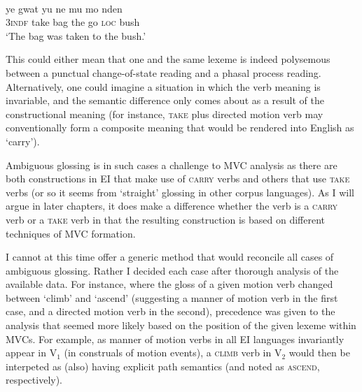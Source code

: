 \ea \label{}
\\
\gll ye gwat yu ne mu mo nden \\
3\textsc{indf} take bag the go \textsc{loc} bush \\
\glft `The bag was taken to the bush.' \\ 
\z

This could either mean that one and the same lexeme is indeed polysemous between a punctual change-of-state reading and a phasal process reading. Alternatively, one could imagine a situation in which the verb meaning is invariable, and the semantic difference only comes about as a result of the constructional meaning (for instance, \textsc{take} plus directed motion verb may conventionally form a composite meaning that would be rendered into English as `carry'). 

Ambiguous glossing is in such cases a challenge to MVC analysis as there are both constructions in EI that make use of \textsc{carry} verbs and others that use \textsc{take} verbs (or so it seems from `straight' glossing in other corpus languages). As I will argue in later chapters, it does make a difference whether the verb is a \textsc{carry} verb or a \textsc{take} verb in that the resulting construction is based on different techniques of MVC formation. 

I cannot at this time offer a generic method that would reconcile all cases of ambiguous glossing. Rather I decided each case after thorough analysis of the available data. For instance, where the gloss of a given motion verb changed between `climb' and `ascend' (suggesting a manner of motion verb in the first case, and a directed motion verb in the second), precedence was given to the analysis that seemed more likely based on the position of the given lexeme within MVCs. For example, as manner of motion verbs in all EI languages invariantly appear in V$_1$ (in construals of motion events), a \textsc{climb} verb in V$_2$ would then be interpeted as (also) having explicit path semantics (and noted as \textsc{ascend}, respectively). 

